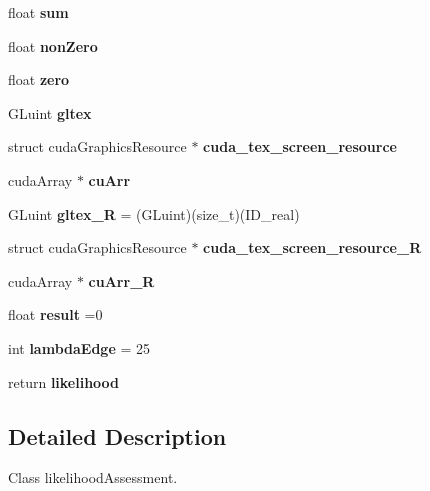 \begin{DoxyCompactItemize}
\item 
float {\bfseries sum}\label{likelihood_8cpp_aeeafe7e9eebbd2a45ce4fa2ae0d96c51}

\item 
float {\bfseries non\+Zero}\label{likelihood_8cpp_a3f02be2b8a083cd0559c65abaf13a3d0}

\item 
float {\bfseries zero}\label{likelihood_8cpp_af4c259b2f53ff142ff807d740df48e56}

\item 
G\+Luint {\bfseries gltex}\label{likelihood_8cpp_a510b368e71006cc0ea18d9d510ef4d65}

\item 
struct cuda\+Graphics\+Resource $\ast$ {\bfseries cuda\+\_\+tex\+\_\+screen\+\_\+resource}\label{likelihood_8cpp_a8542be0f127dd1314ae2b3ca62884cb2}

\item 
cuda\+Array $\ast$ {\bfseries cu\+Arr}\label{likelihood_8cpp_a087b5d932ee4cb16898e673b2c143bc8}

\item 
G\+Luint {\bfseries gltex\+\_\+R} = (G\+Luint)(size\+\_\+t)(I\+D\+\_\+real)\label{likelihood_8cpp_afac9f93f2e96914d47151ae1151102c9}

\item 
struct cuda\+Graphics\+Resource $\ast$ {\bfseries cuda\+\_\+tex\+\_\+screen\+\_\+resource\+\_\+R}\label{likelihood_8cpp_aa27e72dc1f120f942f2d0a9655da0a8b}

\item 
cuda\+Array $\ast$ {\bfseries cu\+Arr\+\_\+R}\label{likelihood_8cpp_a840ece47918ff66079556022af6a848f}

\item 
float {\bfseries result} =0\label{likelihood_8cpp_a8b6cc3f78b62c5c59645624670120e4d}

\item 
int {\bfseries lambda\+Edge} = 25\label{likelihood_8cpp_ad904c470c3f681bf2facdd83e11382f6}

\item 
return {\bfseries likelihood}\label{likelihood_8cpp_adaadafc85d61f77d1a0b229127cd9200}

\end{DoxyCompactItemize}


\subsection{Detailed Description}
Class likelihood\+Assessment. 

